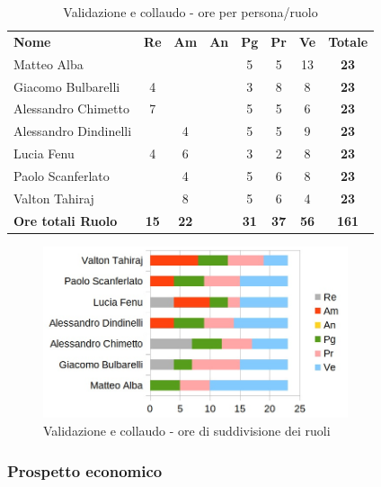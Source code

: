 		\begin{table} [h!]
			\begin{center}
				\begin{tabular} { m{3.5cm} c c c c c c c }
					\rowcolor{lightgray}
					\textbf{Nome} & \textbf{Re} & \textbf{Am} & \textbf{An} & \textbf{Pg} & \textbf{Pr} & \textbf{Ve} & \textbf{Totale} \\
					Matteo Alba & & & & 5 & 5 & 13 & \textbf{23} \\
					Giacomo Bulbarelli & 4 & & & 3 & 8 & 8 & \textbf{23} \\
					Alessandro Chimetto & 7 & & & 5 & 5 & 6 & \textbf{23} \\
					Alessandro Dindinelli & & 4 & & 5 & 5 & 9 & \textbf{23} \\
					Lucia Fenu & 4 & 6 & & 3 & 2 & 8 & \textbf{23} \\
					Paolo Scanferlato & & 4 & & 5 & 6 & 8 & \textbf{23} \\
					Valton Tahiraj & & 8 & & 5 & 6 & 4 & \textbf{23} \\
					\textbf{Ore totali Ruolo} & \textbf{15} & \textbf{22} & \textbf{} & \textbf{31} & \textbf{37}& \textbf{56} & \textbf{161}
				\end{tabular}
				\caption{Validazione e collaudo - ore per persona/ruolo}
			\end{center}
		\end{table}
	
		\begin{figure} [h!]
			\centering
			\includegraphics[width=0.8\textwidth]{res/img/grafici/validazione_e_collaudo_ore_ruolo.jpg}
			\caption{Validazione e collaudo - ore di suddivisione dei ruoli} 
		\end{figure}
	
	\newpage
	
	\subsubsection{Prospetto economico}
	

